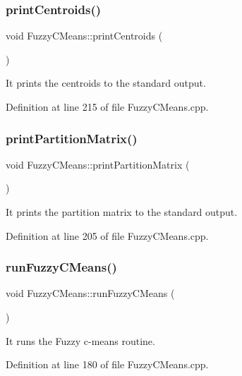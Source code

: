 \mbox{\label{class_fuzzy_c_means_adaf587cc5ae0613f373860079d9b9447}} 
\subsubsection{print\+Centroids()}
{\footnotesize\ttfamily void Fuzzy\+C\+Means\+::print\+Centroids (\begin{DoxyParamCaption}{ }\end{DoxyParamCaption})}

It prints the centroids to the standard output. 

Definition at line 215 of file Fuzzy\+C\+Means.\+cpp.

\mbox{\label{class_fuzzy_c_means_abe9686594626cb7867da45fadd8a44ce}} 
\subsubsection{print\+Partition\+Matrix()}
{\footnotesize\ttfamily void Fuzzy\+C\+Means\+::print\+Partition\+Matrix (\begin{DoxyParamCaption}{ }\end{DoxyParamCaption})}

It prints the partition matrix to the standard output. 

Definition at line 205 of file Fuzzy\+C\+Means.\+cpp.

\mbox{\label{class_fuzzy_c_means_a79db259f351e533d5c9d011b41935152}} 
\subsubsection{run\+Fuzzy\+C\+Means()}
{\footnotesize\ttfamily void Fuzzy\+C\+Means\+::run\+Fuzzy\+C\+Means (\begin{DoxyParamCaption}{ }\end{DoxyParamCaption})}

It runs the Fuzzy c-\/means routine. 

Definition at line 180 of file Fuzzy\+C\+Means.\+cpp.

